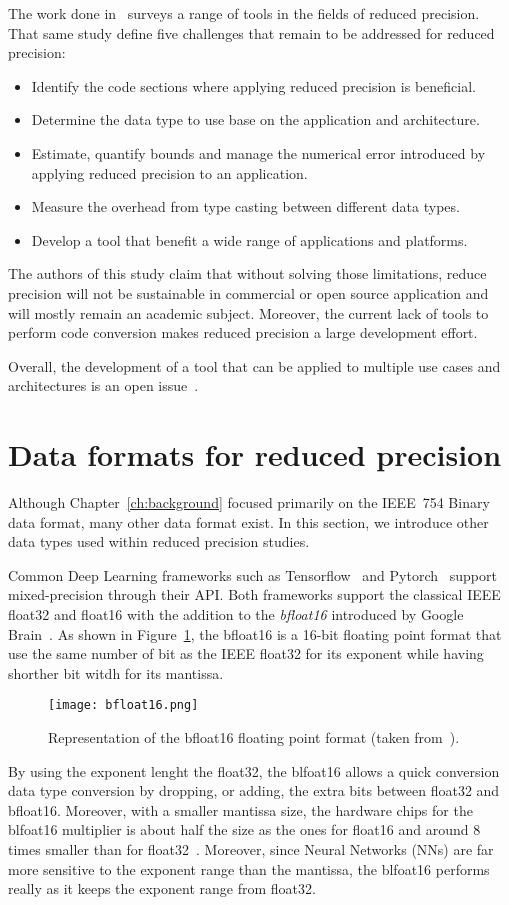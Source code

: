 The work done in~\cite{Cherubin2020-tt} surveys a range of tools in the fields of reduced precision.
That same study define five challenges that remain to be addressed for reduced precision:
\begin{itemize}
	\item[1.] Identify the code sections where applying reduced precision is beneficial.
	\item[2.] Determine the data type to use base on the application and architecture.
	\item[3.] Estimate, quantify bounds and manage the numerical error introduced by applying reduced precision to an application.
	\item[4.] Measure the overhead from type casting between different data types.
	\item[5.] Develop a tool that benefit a wide range of applications and platforms.
\end{itemize}
The authors of this study claim that without solving those limitations, reduce 
precision will not be sustainable in commercial or open source application and 
will mostly remain an academic subject.
Moreover, the current lack of tools to perform code conversion makes reduced precision
a large development effort.

Overall, the development of a tool that can be applied to multiple use cases and
architectures is an open issue~\cite{Cherubin2020-tt}.

\section{Data formats for reduced precision}
\label{sc:rp-data-format}
Although Chapter~\ref{ch:background} focused primarily on the IEEE~754 Binary data format, many other data format exist.
In this section, we introduce other data types used within reduced precision studies.

Common Deep Learning frameworks such as Tensorflow~\cite{tensorflow2015-whitepaper} and Pytorch~\cite{PyTorch_2019} support mixed-precision through their API.
Both frameworks support the classical IEEE float32 and float16 with the addition to the \textit{bfloat16} introduced by Google Brain~\cite{bfloat16}.
As shown in Figure~\ref{fig:bfloat16}, the bfloat16 is a 16-bit floating point format that use
the same number of bit as the IEEE float32 for its exponent while having shorther bit witdh for its mantissa.
\begin{figure}[b]
	\centering
	\texttt{[image: bfloat16.png]}
	\caption{Representation of the bfloat16 floating point format (taken from~\cite{bfloat16}).}
	\label{fig:bfloat16}
\end{figure}
By using the exponent lenght the float32, the blfoat16 allows a quick conversion
data type conversion by dropping, or adding, the extra bits between float32 and bfloat16.
Moreover, with a smaller mantissa size, the hardware chips for the blfoat16 multiplier
is about half the size as the ones for float16 and around 8 times smaller than for float32~\cite{bfloat16}.
Moreover, since Neural Networks (NNs) are far more sensitive to the exponent range than the mantissa,
the blfoat16 performs really as it keeps the exponent range from float32.

